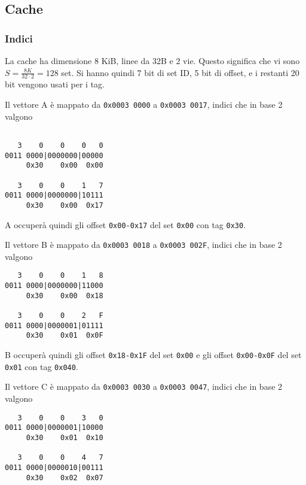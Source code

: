 \documentclass[a4paper]{article}
\begin{document}
\begin{verbatim}
\end{verbatim}

\subsection{Cache}
\subsubsection{Indici}
La cache ha dimensione 8 KiB, linee da 32B e 2 vie.
Questo significa che vi sono $S = \frac{8K}{32 \cdot 2} = 128$ set.
Si hanno quindi 7 bit di set ID, 5 bit di offset, e i restanti 20 bit vengono usati per i tag.

Il vettore A è mappato da \texttt{0x0003 0000} a \texttt{0x0003 0017}, indici che in base 2 valgono

\begin{verbatim}

   3    0    0    0   0
0011 0000|0000000|00000
     0x30    0x00  0x00

   3    0    0    1   7
0011 0000|0000000|10111
     0x30    0x00  0x17

\end{verbatim}

A occuperà quindi gli offset \texttt{0x00-0x17} del set \texttt{0x00} con tag \texttt{0x30}.

Il vettore B è mappato da \texttt{0x0003 0018} a \texttt{0x0003 002F}, indici che in base 2 valgono

\begin{verbatim}
   3    0    0    1   8
0011 0000|0000000|11000
     0x30    0x00  0x18

   3    0    0    2   F
0011 0000|0000001|01111
     0x30    0x01  0x0F
\end{verbatim}

B occuperà quindi gli offset \texttt{0x18-0x1F} del set \texttt{0x00} e gli offset \texttt{0x00-0x0F} del set \texttt{0x01} con tag \texttt{0x040}.

Il vettore C è mappato da \texttt{0x0003 0030} a \texttt{0x0003 0047}, indici che in base 2 valgono

\begin{verbatim}
   3    0    0    3   0
0011 0000|0000001|10000
     0x30    0x01  0x10

   3    0    0    4   7
0011 0000|0000010|00111
     0x30    0x02  0x07
\end{verbatim}
\end{document}
